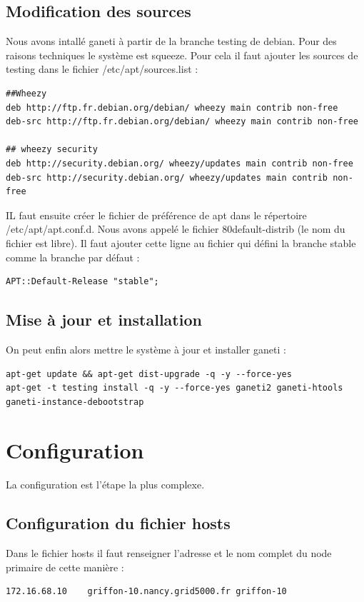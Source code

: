 \subsection {Modification des sources}
Nous avons intallé ganeti à partir de la branche testing de debian. Pour des raisons techniques le système est squeeze. Pour cela il faut ajouter les sources de testing dans le fichier /etc/apt/sources.list :
\begin{lstlisting}
##Wheezy
deb http://ftp.fr.debian.org/debian/ wheezy main contrib non-free
deb-src http://ftp.fr.debian.org/debian/ wheezy main contrib non-free

## wheezy security
deb http://security.debian.org/ wheezy/updates main contrib non-free
deb-src http://security.debian.org/ wheezy/updates main contrib non-free
\end{lstlisting}

IL faut ensuite créer le fichier de préférence de apt dans le répertoire /etc/apt/apt.conf.d. Nous avons appelé le  fichier 80default-distrib (le nom du fichier est libre). Il faut ajouter cette ligne au fichier qui défini la branche stable comme la branche par défaut :
\begin{lstlisting}
APT::Default-Release "stable";
\end{lstlisting}

\subsection {Mise à jour et installation}
On peut enfin alors mettre le système à jour et installer ganeti :

\begin{lstlisting}
apt-get update && apt-get dist-upgrade -q -y --force-yes
apt-get -t testing install -q -y --force-yes ganeti2 ganeti-htools ganeti-instance-debootstrap
\end{lstlisting}

\section {Configuration}

La configuration est l'étape la plus complexe.

\subsection {Configuration du fichier hosts}

Dans le fichier hosts il faut renseigner l'adresse et le nom complet du node primaire de cette manière :
\begin{lstlisting}
172.16.68.10    griffon-10.nancy.grid5000.fr griffon-10
\end{lstlisting}
